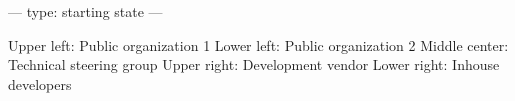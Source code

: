 ---
type: starting state
---

Upper left: Public organization 1
Lower left: Public organization 2
Middle center: Technical steering group
Upper right: Development vendor
Lower right: Inhouse developers
